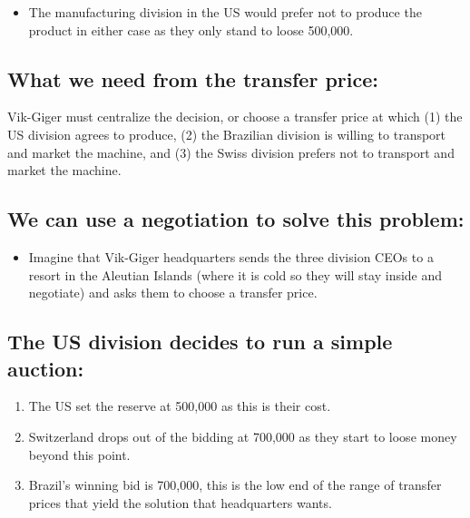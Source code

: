 \begin{itemize}
\tightlist
\item
  The manufacturing division in the US would prefer not to produce the
  product in either case as they only stand to loose 500,000.
\end{itemize}

\hypertarget{what-we-need-from-the-transfer-price}{%
\subsection{What we need from the transfer
price:}\label{what-we-need-from-the-transfer-price}}

Vik-Giger must centralize the decision, or choose a transfer price at
which (1) the US division agrees to produce, (2) the Brazilian division
is willing to transport and market the machine, and (3) the Swiss
division prefers not to transport and market the machine.

\hypertarget{we-can-use-a-negotiation-to-solve-this-problem}{%
\subsection{We can use a negotiation to solve this
problem:}\label{we-can-use-a-negotiation-to-solve-this-problem}}

\begin{itemize}
\tightlist
\item
  Imagine that Vik-Giger headquarters sends the three division CEOs to a
  resort in the Aleutian Islands (where it is cold so they will stay
  inside and negotiate) and asks them to choose a transfer price.
\end{itemize}

\hypertarget{the-us-division-decides-to-run-a-simple-auction}{%
\subsection{The US division decides to run a simple
auction:}\label{the-us-division-decides-to-run-a-simple-auction}}

\begin{enumerate}
\def\labelenumi{\arabic{enumi}.}
\tightlist
\item
  The US set the reserve at 500,000 as this is their cost.
\item
  Switzerland drops out of the bidding at 700,000 as they start to loose
  money beyond this point.
\item
  Brazil's winning bid is 700,000, this is the low end of the range of
  transfer prices that yield the solution that headquarters wants.
\end{enumerate}

